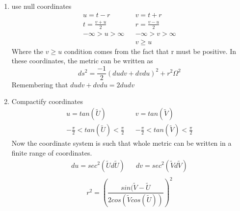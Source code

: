 \documentclass[10pt]{article}
\begin{document}
               	\begin{enumerate}
                    \item use null coordinates 
                    \begin{equation}
                   \begin{align}
                        u=t-r && v=t+r\\
                        t=\frac{v+u}{2} &&r=\frac{v-u}{2} \\
                        -\infty>u>\infty && -\infty>v>\infty\\
                        && v\geq{u}
                        \end{align}
                    \end{equation}
                    Where the \(v\geq{u}\) condition comes from the fact that r must be positive. 
                    In these coordinates, the metric can be written as 
                    \begin{equation}
                        ds^2=\frac{-1}{2}(dudv+dvdu)^2+r^2\Omega^2
                    \end{equation}
                    Remembering that \(dudv+dvdu=2dudv\)
                    \item Compactify coordinates
                    \begin{equation}
                   \begin{align}
                        u=tan(\widetilde{U}) && v=tan(\widetilde{V})\\
                        -\frac{\pi}{2}<tan(\widetilde{U})<\frac{\pi}{2} && -\frac{\pi}{2}<tan(\widetilde{V})<\frac{\pi}{2}
                        \end{align}
                    \end{equation}
            Now the coordinate system is such that whole metric can be written in a finite range of coordinates.
                                \begin{equation}
                   \begin{align}
                        du=sec^2(\widetilde{U}d\widetilde{U})&&dv=sec^2(\widetilde{V}d\widetilde{V})\\
                        \end{align}
                    \end{equation}
                    \begin{equation}
                        r^2=(\frac{sin(\widetilde{V}-\widetilde{U}}{2cos(\widetilde{V}cos(\widetilde{U}))})^2
                    \end{equation}
            

\end{enumerate}
\end{document}
